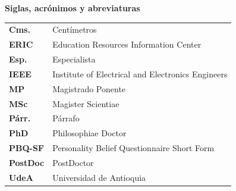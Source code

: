 \pagestyle{empty}
\renewcommand{\contentsname}{\centerline{\normalfont\normalsize TABLA DE CONTENIDO}}
    \tableofcontents 
    
    
    
\newpage
     \pagestyle{empty}
    \renewcommand{\listtablename}{\centerline{\normalfont\normalsize LISTA DE TABLAS}}
    \listoftables
    
    
    
    
\newpage
    \thispagestyle{empty}
    
    \renewcommand{\listfigurename}{\centerline{\normalfont\normalsize LISTA DE FIGURAS}}
    \listoffigures 
    
    
    
    
\newpage
    \thispagestyle{empty}
    
\begin{center}
    \textbf{Siglas, acrónimos y abreviaturas}    %
\end{center}

\begin{tabular}{m{2cm}p{10cm}}
    \textbf{Cms.}	    &	Centímetros\\
    \textbf{ERIC}	    &	Education Resources Information Center\\
    \textbf{Esp.}	    &	Especialista\\
    \textbf{IEEE}		&	Institute of Electrical and Electronics Engineers \\
    \textbf{MP}		    &	Magistrado Ponente\\
    \textbf{MSc}		&	Magister Scientiae\\
    \textbf{Párr.}	    &	Párrafo\\
    \textbf{PhD}		&	Philosophiae Doctor\\
    \textbf{PBQ-SF} 	&	Personality Belief Questionnaire Short Form\\
    \textbf{PostDoc}	&	PostDoctor\\
    \textbf{UdeA}	    &	Universidad de Antioquia
\end{tabular}
